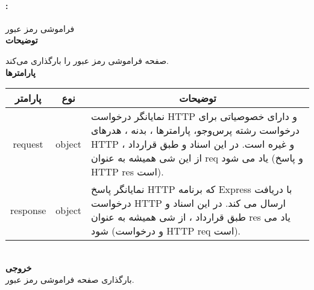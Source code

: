 \paragraph{:}
فراموشی رمز عبور
\\
\textbf{توضیحات}
\hr
\begin{flushleft}
	\framebox[.9\textwidth][l]{
		\lr{
			\textcolor{type}{void}
			\textcolor{func}{getForgot}
			\textcolor{symb}{(}
			\textcolor{type}{object}
			\textcolor{arg}{request}
			\textcolor{symb}{,}
			\textcolor{type}{object}
			\textcolor{arg}{response}
			\textcolor{symb}{);}
		}
	}
\end{flushleft}
صفحه فراموشی رمز عبور را بارگذاری می‌کند.
\\
\textbf{پارامترها}
\hr \\[10pt]
\begin{tabular}{|m{4cm}|m{3cm}|m{10cm}|}
	\hline
	\multicolumn{1}{|c}{پارامتر}
	&
	\multicolumn{1}{|c}{نوع}
	&
	\multicolumn{1}{|c|}{توضیحات}
	\\
	\hline
	\multicolumn{1}{|c}{request}
	&
	\multicolumn{1}{|c|}{object}
	&
	نمایانگر درخواست HTTP و دارای خصوصیاتی برای درخواست رشته پرس‌و‌جو، پارامترها ، بدنه ، هدرهای HTTP و غیره است.
	در این اسناد و طبق قرارداد ، از این شی همیشه به عنوان req یاد می شود (و پاسخ HTTP res است).
	\\
	\hline
	\multicolumn{1}{|c}{response}
	&
	\multicolumn{1}{|c|}{object}
	&
	نمایانگر پاسخ HTTP که برنامه Express با دریافت درخواست HTTP ارسال می کند.
	در این اسناد و طبق قرارداد ، از شی همیشه به عنوان res یاد می شود (و درخواست HTTP req است).
	\\
	\hline
\end{tabular}
\\[10pt]
\textbf{خروجی}
\hr \\
بارگذاری صفحه فراموشی رمز عبور.


